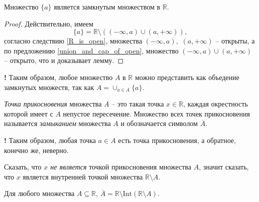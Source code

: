 \begin{lemma}
    Множество $\{a\}$ является замкнутым множеством в $\mathbb{R}$.
\end{lemma}

\begin{proof}
    Действительно, имеем
    \[
    \{a\} = \mathbb{R}\setminus \left( (-\infty, a) \cup (a, +\infty) \right),
    \]
согласно следствию \ref{R_is_open}, множества $(-\infty, a),$ $(a, +\infty)$ -- открыты, а по предложению \ref{union_and_cap_of_open}, множество $(-\infty, a) \cup (a, +\infty)$ -- открыто, что и доказывает лемму.
\end{proof}

\begin{mydanger}{\bf !}
Таким образом, любое множество $A$ в $\mathbb{R}$ можно представить как объедение замкнутых множеств, так как $A = \cup_{a \in A}\{a\}.$
\end{mydanger}

\begin{definition}\label{limit_point}
  \textit{Точка прикосновения} множества $A$ -- это такая точка $x \in \mathbb{R}$, каждая окрестность которой имеет с $A$ непустое пересечение. Множество всех точек прикосновения называется \textit{замыканием} множества $A$ и обозначается символом $\overline{A}.$
\end{definition}

\begin{mydanger}{\bf !}
    Таким образом, любая точка $a\in A$ есть точка прикосновения, а обратное, конечно же, неверно.
\end{mydanger}

\begin{remark}
Сказать, что \textit{$x$ не является} точкой прикосновения множества $A$, значит сказать, что $x$ является внутренней точкой множества $\mathbb{R}\setminus A.$ 
\end{remark}

\begin{proposition}\label{closure(A)=R-(R-A)}
Для любого множества $A \subseteq \mathbb{R}$, $\overline{A} = \mathbb{R}\setminus \mathrm{Int}(\mathbb{R}\setminus A).$    
\end{proposition}

